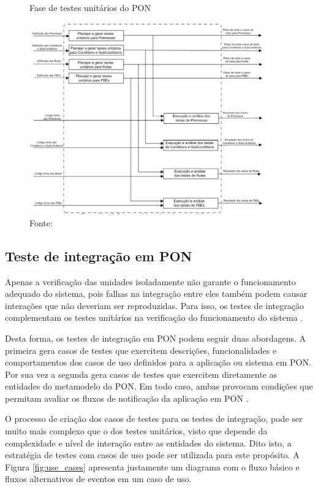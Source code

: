 \begin{figure}[!htb]
  \centering
  \caption{Fase de testes unitários do PON}
  \includegraphics[width=0.9\textwidth]{../figures/unit_pon.png}
  \smallskip
  \caption*{Fonte: }
  \label{fig:unit_pon}
\end{figure}

\subsection{Teste de integração em PON}\label{sec:int_pon}

Apenas a verificação das unidades isoladamente não garante o funcionamento
adequado do sistema, pois falhas na integração entre eles também podem causar
interações que não deveriam ser reproduzidas. Para isso, os testes de integração
complementam os testes unitários na verificação do funcionamento do sistema
\cite{binder_1999}.

Desta forma, os testes de integração em PON podem seguir duas abordagens. A
primeira gera casos de testes que exercitem descrições, funcionalidades e
comportamentos dos casos de uso definidos para a aplicação ou sistema em PON.
Por sua vez a segunda gera casos de testes que exercitem diretamente as
entidades do metamodelo do PON. Em todo caso, ambas provocam condições que
permitam avaliar os fluxos de notificação da aplicação em PON
\cite{msc_Kossoski_2015}.

O processo de criação dos casos de testes para os testes de integração, pode ser
muito mais complexo que o dos testes unitários, visto que depende da
complexidade e nível de interação entre as entidades do sistema. Dito isto, a
estratégia de testes com casos de uso pode ser utilizada para este propósito. A
Figura \ref{fig:use_cases} apresenta justamente um diagrama com o fluxo básico e
fluxos alternativos de eventos em um caso de uso. 

